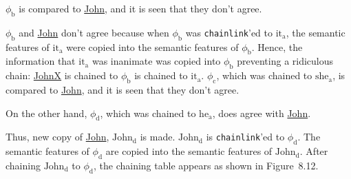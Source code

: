 \documentclass{article}
\begin{document}
\noindent \underline{${\phi_{\textrm{b}}}$} is compared to \underline{John}, and
it is seen that they don't agree.

\bigbreak
\vbox{}
\bigbreak

\noindent \underline{${\phi_{\textrm{b}}}$} and \underline{John} don't agree
because when \underline{${\phi_{\textrm{b}}}$} was \texttt{chainlink}'ed to
\underline{${\textrm{it}_{\textrm{a}}}$}, the semantic features of \underline{${\textrm{it}_{\textrm{a}}}$} were
copied into the semantic features of \underline{${\phi_{\textrm{b}}}$}. Hence,
the information that \underline{${\textrm{it}_{\textrm{a}}}$} was inanimate was copied
into \underline{${\phi_{\textrm{b}}}$} preventing a ridiculous chain:
\underline{JohnX} is chained to \underline{${\phi_{\textrm{b}}}$} is chained to
\underline{${\textrm{it}_{\textrm{a}}}$}. \underline{${\phi_{\textrm{c}}}$}, which was chained to
\underline{${\textrm{she}_{\textrm{a}}}$}, is compared to \underline{John}, and it is
seen that they don't agree.

\bigbreak
\vbox{}
\bigbreak

\noindent On the other hand, \underline{${\phi_{\textrm{d}}}$}, which was chained
to \underline{${\textrm{he}_{\textrm{a}}}$}, does agree with \underline{John}.

\bigbreak
\vbox{}
\bigbreak

\noindent Thus, new copy of \underline{John},
\underline{${\textrm{John}_{\textrm{d}}}$} is made.
\underline{${\textrm{John}_{\textrm{d}}}$} is \texttt{chainlink}'ed to
\underline{${\phi_{\textrm{d}}}$}. The semantic features of
\underline{${\phi_{\textrm{d}}}$} are copied into the semantic features of
\underline{${\textrm{John}_{\textrm{d}}}$}. After chaining
\underline{${\textrm{John}_{\textrm{d}}}$} to \underline{${\phi_{\textrm{d}}}$}, the
chaining table appears as shown in Figure~8.12.
\end{document}
